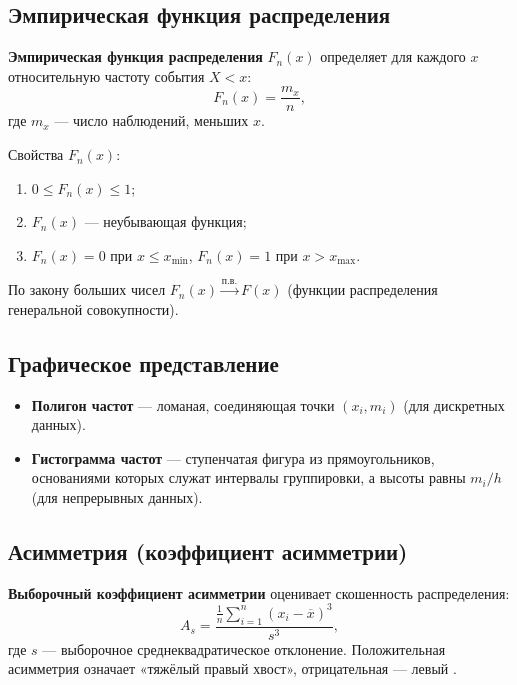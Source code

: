 \documentclass[10pt]{article}
\begin{document}
\subsection{Эмпирическая функция распределения}
\begin{definition}
\textbf{Эмпирическая функция распределения} $F_n(x)$ определяет для каждого $x$ относительную частоту события $X < x$:
\[
F_n(x) = \frac{m_x}{n},
\]
где $m_x$ — число наблюдений, меньших $x$.
\end{definition}
Свойства $F_n(x)$:
\begin{enumerate}
    \item $0 \le F_n(x) \le 1$;
    \item $F_n(x)$ — неубывающая функция;
    \item $F_n(x) = 0$ при $x \le x_{\min}$, $F_n(x) = 1$ при $x > x_{\max}$.
\end{enumerate}
По закону больших чисел $F_n(x) \xrightarrow{\text{п.в.}} F(x)$ (функции распределения генеральной совокупности).

\subsection{Графическое представление}
\begin{itemize}
    \item \textbf{Полигон частот} — ломаная, соединяющая точки $(x_i, m_i)$ (для дискретных данных).
    \item \textbf{Гистограмма частот} — ступенчатая фигура из прямоугольников, основаниями которых служат интервалы группировки, а высоты равны $m_i/h$ (для непрерывных данных).
\end{itemize}

\subsection{Асимметрия (коэффициент асимметрии)}
\begin{definition}
\textbf{Выборочный коэффициент асимметрии} оценивает скошенность распределения:
\[
A_s = \frac{\frac{1}{n}\sum_{i=1}^n (x_i - \overline{x})^3}{s^3},
\]
где $s$ — выборочное среднеквадратическое отклонение. Положительная асимметрия означает «тяжёлый правый хвост», отрицательная — левый .
\end{definition}
\end{document}
